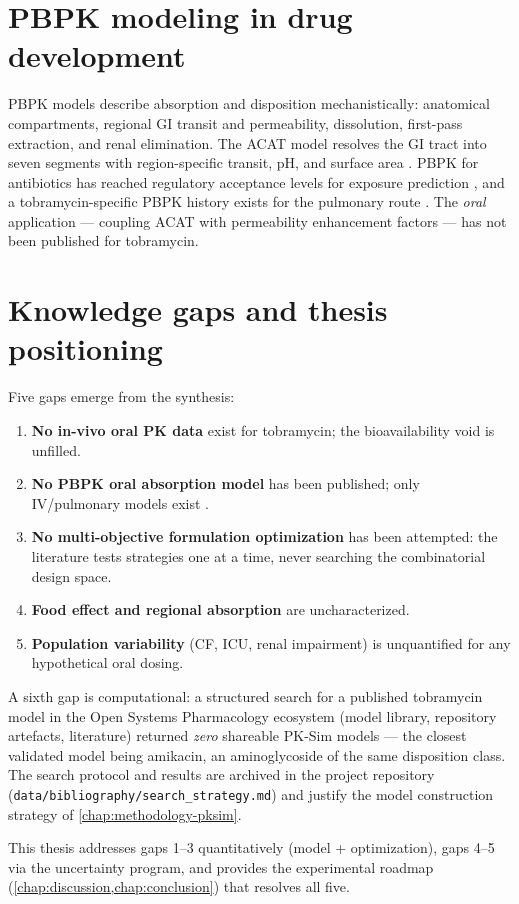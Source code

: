 \section{PBPK modeling in drug development}
\label{sec:lit-pbpk}
PBPK models describe absorption and disposition mechanistically: anatomical compartments, regional GI transit and permeability, dissolution, first-pass extraction, and renal elimination. The  ACAT model resolves the GI tract into seven segments with region-specific transit, pH, and surface area \citep{Willmann2007, OSP2024}. PBPK for antibiotics has reached regulatory acceptance levels for exposure prediction \citep{Ferreira2021}, and a tobramycin-specific PBPK history exists for the pulmonary route \citep{Lukacova2010}. The \emph{oral} application --- coupling ACAT with permeability enhancement factors --- has not been published for tobramycin.

\section{Knowledge gaps and thesis positioning}
\label{sec:lit-gaps}
Five gaps emerge from the synthesis:
\begin{enumerate}
\item \textbf{No in-vivo oral PK data} exist for tobramycin; the bioavailability void is unfilled.
\item \textbf{No PBPK oral absorption model} has been published; only IV/pulmonary models exist \citep{Li2021, Lukacova2010}.
\item \textbf{No multi-objective formulation optimization} has been attempted: the literature tests strategies one at a time, never searching the combinatorial design space.
\item \textbf{Food effect and regional absorption} are uncharacterized.
\item \textbf{Population variability} (CF, ICU, renal impairment) is unquantified for any hypothetical oral dosing.
\end{enumerate}
A sixth gap is computational: a structured search for a published tobramycin model in the Open Systems Pharmacology ecosystem (model library, repository artefacts, literature) returned \emph{zero} shareable PK-Sim models --- the closest validated model being amikacin, an aminoglycoside of the same disposition class. The search protocol and results are archived in the project repository (\texttt{data/bibliography/search\_strategy.md}) and justify the model construction strategy of \cref{chap:methodology-pksim}.

This thesis addresses gaps 1--3 quantitatively (model + optimization), gaps 4--5 via the uncertainty program, and provides the experimental roadmap (\cref{chap:discussion,chap:conclusion}) that resolves all five.

